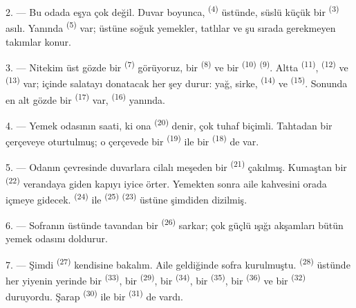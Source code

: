 2. --- Bu odada eşya çok değil. Duvar boyunca, 
\textsuperscript{(4)} üstünde, süslü küçük bir 
\textsuperscript{(3)} asılı. Yanında  \textsuperscript{(5)}
var; üstüne soğuk yemekler, tatlılar ve şu sırada gerekmeyen takımlar
konur.

3. --- Nitekim üst gözde bir  \textsuperscript{(7)}
görüyoruz, bir  \textsuperscript{(8)} ve bir 
\textsuperscript{(10)}  \textsuperscript{(9)}. Altta
 \textsuperscript{(11)},  \textsuperscript{(12)}
ve  \textsuperscript{(13)} var; içinde salatayı
donatacak her şey durur: yağ, sirke,  \textsuperscript{(14)} ve
 \textsuperscript{(15)}. Sonunda en alt gözde bir
 \textsuperscript{(17)} var, 
\textsuperscript{(16)} yanında.

4. --- Yemek odasının saati, ki ona  \textsuperscript{(20)}
denir, çok tuhaf biçimli. Tahtadan bir çerçeveye oturtulmuş; o çerçevede
bir  \textsuperscript{(19)} ile bir 
\textsuperscript{(18)} de var.

\VUsaut{4.6mm}
\VUsaut{3.0mm}

5. --- Odanın çevresinde duvarlara cilalı meşeden bir 
\textsuperscript{(21)} çakılmış. Kumaştan bir 
\textsuperscript{(22)} verandaya giden kapıyı iyice örter. Yemekten sonra aile
kahvesini orada içmeye gidecek.  \textsuperscript{(24)} ile
 \textsuperscript{(25)} 
\textsuperscript{(23)} üstüne şimdiden dizilmiş.

6. --- Sofranın üstünde tavandan bir  \textsuperscript{(26)}
sarkar; çok güçlü ışığı akşamları bütün yemek odasını doldurur.

7. --- Şimdi  \textsuperscript{(27)} kendisine
bakalım. Aile geldiğinde sofra kurulmuştu. 
\textsuperscript{(28)} üstünde her yiyenin yerinde bir 
\textsuperscript{(33)}, bir  \textsuperscript{(29)}, bir
 \textsuperscript{(34)}, bir 
\textsuperscript{(35)}, bir  \textsuperscript{(36)} ve bir
 \textsuperscript{(32)} duruyordu. Şarap 
\textsuperscript{(30)} ile bir  \textsuperscript{(31)} de
vardı.

